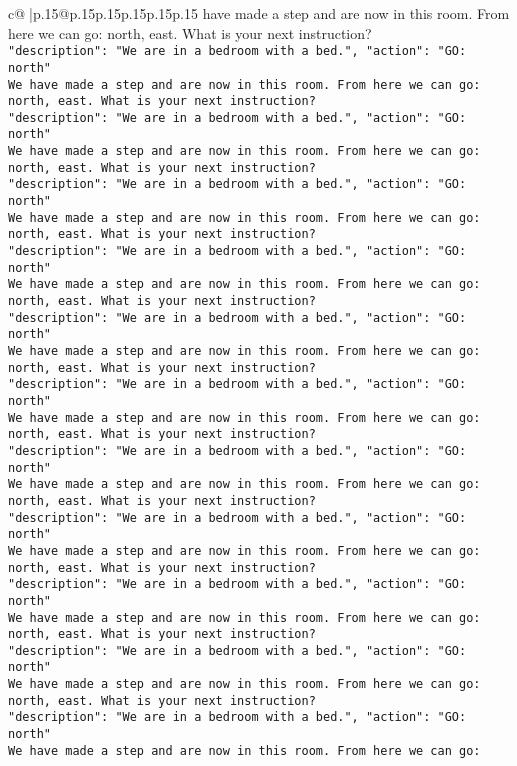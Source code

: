 \documentclass{article}
\begin{document}
{\begin{supertabular}{c@{$\;$}|p{.15\linewidth}@{}p{.15\linewidth}p{.15\linewidth}p{.15\linewidth}p{.15\linewidth}p{.15\linewidth}}
{{{have made a step and are now in this room. From here we can go: north, east. What is your next instruction?\\ \tt {"description": "We are in a bedroom with a bed.", "action": "GO: north"}\\ \tt We have made a step and are now in this room. From here we can go: north, east. What is your next instruction?\\ \tt {"description": "We are in a bedroom with a bed.", "action": "GO: north"}\\ \tt We have made a step and are now in this room. From here we can go: north, east. What is your next instruction?\\ \tt {"description": "We are in a bedroom with a bed.", "action": "GO: north"}\\ \tt We have made a step and are now in this room. From here we can go: north, east. What is your next instruction?\\ \tt {"description": "We are in a bedroom with a bed.", "action": "GO: north"}\\ \tt We have made a step and are now in this room. From here we can go: north, east. What is your next instruction?\\ \tt {"description": "We are in a bedroom with a bed.", "action": "GO: north"}\\ \tt We have made a step and are now in this room. From here we can go: north, east. What is your next instruction?\\ \tt {"description": "We are in a bedroom with a bed.", "action": "GO: north"}\\ \tt We have made a step and are now in this room. From here we can go: north, east. What is your next instruction?\\ \tt {"description": "We are in a bedroom with a bed.", "action": "GO: north"}\\ \tt We have made a step and are now in this room. From here we can go: north, east. What is your next instruction?\\ \tt {"description": "We are in a bedroom with a bed.", "action": "GO: north"}\\ \tt We have made a step and are now in this room. From here we can go: north, east. What is your next instruction?\\ \tt {"description": "We are in a bedroom with a bed.", "action": "GO: north"}\\ \tt We have made a step and are now in this room. From here we can go: north, east. What is your next instruction?\\ \tt {"description": "We are in a bedroom with a bed.", "action": "GO: north"}\\ \tt We have made a step and are now in this room. From here we can go: north, east. What is your next instruction?\\ \tt {"description": "We are in a bedroom with a bed.", "action": "GO: north"}\\ \tt We have made a step and are now in this room. From here we can go: }}}
\end{supertabular}}
\end{document}
